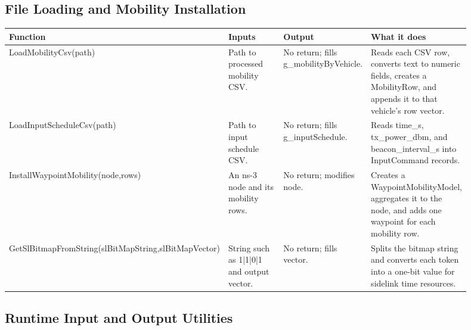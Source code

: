 \documentclass[11pt]{article}
\DeclareRobustCommand{\code}[1]{\texttt{\detokenize{#1}}}
\def\code#1{#1}%
\begin{document}
\subsection{File Loading and Mobility Installation}

\begin{center}
\begin{longtable}{L{0.24\linewidth}L{0.27\linewidth}L{0.18\linewidth}L{0.21\linewidth}}
\toprule
Function & Inputs & Output & What it does \\
\midrule
\endhead
\code{LoadMobilityCsv(path)} &
Path to processed mobility CSV. &
No return; fills \code{g_mobilityByVehicle}. &
Reads each CSV row, converts text to numeric fields, creates a \code{MobilityRow},
and appends it to that vehicle's row vector. \\
\code{LoadInputScheduleCsv(path)} &
Path to input schedule CSV. &
No return; fills \code{g_inputSchedule}. &
Reads \code{time_s}, \code{tx_power_dbm}, and \code{beacon_interval_s} into
\code{InputCommand} records. \\
\code{InstallWaypointMobility(node,rows)} &
An ns-3 node and its mobility rows. &
No return; modifies node. &
Creates a \code{WaypointMobilityModel}, aggregates it to the node, and adds one
waypoint for each mobility row. \\
\code{GetSlBitmapFromString(slBitMapString,slBitMapVector)} &
String such as \code{1|1|0|1} and output vector. &
No return; fills vector. &
Splits the bitmap string and converts each token into a one-bit value for
sidelink time resources. \\
\bottomrule
\end{longtable}
\end{center}

\subsection{Runtime Input and Output Utilities}
\end{document}
